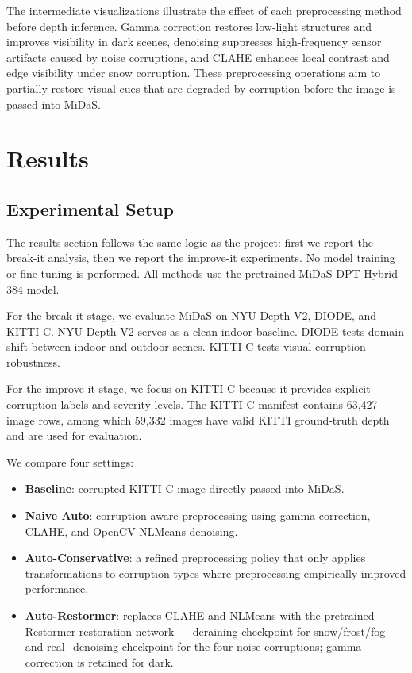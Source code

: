 \documentclass[10pt]{article}
\begin{document}
The intermediate visualizations illustrate the effect of each preprocessing method before depth inference. Gamma correction restores low-light structures and improves visibility in dark scenes, denoising suppresses high-frequency sensor artifacts caused by noise corruptions, and CLAHE enhances local contrast and edge visibility under snow corruption. These preprocessing operations aim to partially restore visual cues that are degraded by corruption before the image is passed into MiDaS.

\section{Results}

\subsection{Experimental Setup}

The results section follows the same logic as the project: first we report the break-it analysis, then we report the improve-it experiments. No model training or fine-tuning is performed. All methods use the pretrained MiDaS DPT-Hybrid-384 model.

For the break-it stage, we evaluate MiDaS on NYU Depth V2, DIODE, and KITTI-C. NYU Depth V2 serves as a clean indoor baseline. DIODE tests domain shift between indoor and outdoor scenes. KITTI-C tests visual corruption robustness.

For the improve-it stage, we focus on KITTI-C because it provides explicit corruption labels and severity levels. The KITTI-C manifest contains 63,427 image rows, among which 59,332 images have valid KITTI ground-truth depth and are used for evaluation.

We compare four settings:
\begin{itemize}[leftmargin=*]
    \item \textbf{Baseline}: corrupted KITTI-C image directly passed into MiDaS.
    \item \textbf{Naive Auto}: corruption-aware preprocessing using gamma correction, CLAHE, and OpenCV NLMeans denoising.
    \item \textbf{Auto-Conservative}: a refined preprocessing policy that only applies transformations to corruption types where preprocessing empirically improved performance.
    \item \textbf{Auto-Restormer}: replaces CLAHE and NLMeans with the pretrained Restormer restoration network --- deraining checkpoint for snow/frost/fog and real\_denoising checkpoint for the four noise corruptions; gamma correction is retained for dark.
\end{itemize}
\end{document}
